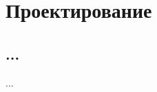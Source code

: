 \documentclass[../document.tex]{subfiles}
\begin{document}
    \section{Проектирование}
        \subsection{...}
            \par ...
\end{document}
